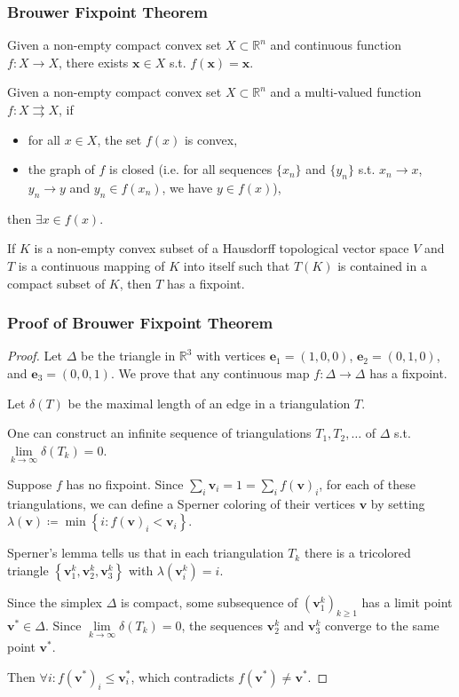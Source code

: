 \documentclass[UTF8,11pt,colorlinks,compress,openany]{beamer}%
\begin{document}
\begin{frame}\frametitle{Brouwer Fixpoint Theorem}
\begin{theorem}
Given a non-empty compact convex set $X\subset\mathbb{R}^n$ and continuous function $f: X\to X$, there exists $\mathbf{x}\in X$ s.t. $f(\mathbf{x})=\mathbf{x}$.
\end{theorem}
\begin{theorem}
Given a non-empty compact convex set $X\subset\mathbb{R}^n$ and a multi-valued function $f: X\rightrightarrows X$, if
\begin{itemize}
	\item for all $x\in X$, the set $f(x)$ is convex,
	\item the graph of $f$ is closed (i.e. for all sequences $\{x_n\}$ and $\{y_n\}$ s.t. $x_n\to x$, $y_n\to y$ and $y_n\in f(x_n)$, we have $y\in f(x)$),
\end{itemize}
then $\exists x\in f(x)$.
\end{theorem}
\begin{theorem}
If $K$ is a non-empty convex subset of a Hausdorff topological vector space $V$ and $T$ is a continuous mapping of $K$ into itself such that $T(K)$ is contained in a compact subset of $K$, then $T$ has a fixpoint.
\end{theorem}
\end{frame}

\begin{frame}\frametitle{Proof of Brouwer Fixpoint Theorem}
\begin{proof}
Let $\Delta$ be the triangle in $\mathbb{R}^3$ with vertices $\mathbf{e}_1=(1, 0, 0)$, $\mathbf{e}_2=(0, 1, 0)$, and $\mathbf{e}_3=(0, 0, 1)$. We prove that any continuous map $f:\Delta\to\Delta$ has a fixpoint.

Let $\delta(T)$ be the maximal length of an edge in a triangulation $T$.

One can construct an infinite sequence of triangulations $T_1, T_2,\dots$ of $\Delta$ s.t. $\lim\limits_{k\to\infty}\delta(T_k)=0$.

Suppose $f$ has no fixpoint. Since $\sum_i \mathbf{v}_i=1=\sum_i f(\mathbf{v})_i$, for each of these triangulations, we can define a Sperner coloring of their vertices $\mathbf{v}$ by setting $\lambda(\mathbf{v})\coloneqq \min\left\{i: f(\mathbf{v})_i<\mathbf{v}_i\right\}$.

Sperner's lemma tells us that in each triangulation $T_k$ there is a tricolored triangle $\left\{\mathbf{v}_1^k,\mathbf{v}_2^k,\mathbf{v}_3^k\right\}$ with $\lambda(\mathbf{v}_i^k)=i$.

Since the simplex $\Delta$ is compact, some subsequence of $\left(\mathbf{v}_1^k\right)_{k\geq 1}$ has a limit point $\mathbf{v}^*\in\Delta$. Since $\lim\limits_{k\to\infty}\delta(T_k)=0$, the sequences $\mathbf{v}_2^k$ and $\mathbf{v}_3^k$ converge to the same point $\mathbf{v}^*$.

Then $\forall i: f(\mathbf{v}^*)_i\leq\mathbf{v}^*_i$, which contradicts $f(\mathbf{v}^*)\neq\mathbf{v}^*$.
\end{proof}
\end{frame}
\end{document}
